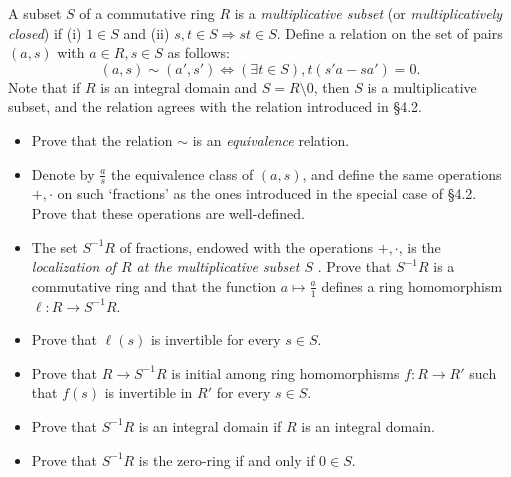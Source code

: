 \documentclass[../../master.tex]{subfiles}
\begin{document}
    \begin{problem}
        A subset $S$ of a commutative ring $R$ is a \textit{multiplicative
        subset} (or \textit{multiplicatively closed}) if (i) $1 \in S$ and (ii)
        $s, t \in S \Longrightarrow st \in S$. Define a relation on the set of
        pairs $(a, s)$ with $a \in R, s \in S$ as follows:
        \[
            (a, s) \sim (a', s') \Longleftrightarrow (\exists t \in S), t(s'a - sa')
            = 0.
        \] 
        Note that if $R$ is an integral domain and $S = R \setminus {0}$, then
        $S$ is a multiplicative subset, and the relation agrees with the
        relation introduced in \S 4.2.
        \begin{itemize}
            \item Prove that the relation $\sim$ is an \textit{equivalence}
                relation.
            \item Denote by $\frac{a}{s}$ the equivalence class of $(a, s)$, and
                define the same operations $+, \cdot$ on such `fractions' as the
                ones introduced in the special case of \S 4.2. Prove that these
                operations are well-defined.
            \item The set $S^{-1}R$ of fractions, endowed with the operations
                $+, \cdot$, is the \textit{localization of $R$ at the
                multiplicative subset $S$ }. Prove that $S^{-1}R$ is a
                commutative ring and that the function $a \mapsto \frac{a}{1}$
                defines a ring homomorphism $\ell: R \to S^{-1}R$.
            \item Prove that $\ell(s)$ is invertible for every $s \in S$.
            \item Prove that $R \to S^{-1}R$ is initial among ring homomorphisms
                $f: R \to R'$ such that $f(s)$ is invertible in $R'$ for every
                $s \in S$.
            \item Prove that $S^{-1}R$ is an integral domain if $R$ is an
                integral domain.
            \item Prove that $S^{-1}R$ is the zero-ring if and only if $0 \in
                S$.
        \end{itemize}
    \end{problem}
\end{document}
